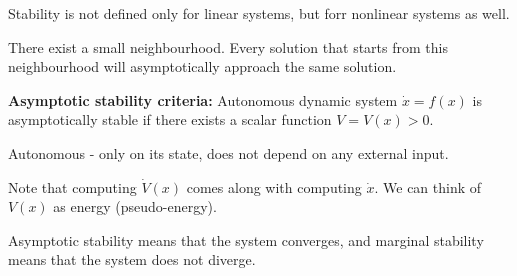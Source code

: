 Stability is not defined only for linear systems, but forr nonlinear systems as well.

There exist a small neighbourhood. Every solution that starts from this neighbourhood will asymptotically approach the same solution. 

\textbf{Asymptotic stability criteria:}
Autonomous dynamic system $\dot x = f(x)$ is asymptotically stable if there exists a scalar function $V = V(x) > 0$. 

Autonomous - only on its state, does not depend on any external input. 

Note that computing $\dot V(x)$ comes along with computing $\dot x$. 
We can think of $V(x)$ as energy (pseudo-energy).

Asymptotic stability means that the system converges, and marginal stability means that the system does not diverge. 
